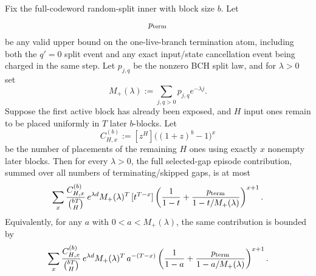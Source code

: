 \begin{lemma}
\label{lem:fullsplit-all-episode-gf-bound}
Fix the full-codeword random-split inner with block size \(b\).  Let
\[
p_{\rm term}
\]
be any valid upper bound on the one-live-branch termination atom, including both the \(q'=0\) split event and any
exact input/state cancellation event being charged in the same step.  Let \(p_{j,q}\) be the nonzero BCH split law, and
for \(\lambda>0\) set
\[
M_+(\lambda):=\sum_{j,q>0} p_{j,q}e^{-\lambda j}.
\]
Suppose the first active block has already been exposed, and \(H\) input ones remain to be placed uniformly in \(T\)
later \(b\)-blocks.  Let
\[
C_{H,x}^{(b)}:=[z^H]\big((1+z)^b-1\big)^x
\]
be the number of placements of the remaining \(H\) ones using exactly \(x\) nonempty later blocks.  Then for every
\(\lambda>0\), the full selected-gap episode contribution, summed over all numbers of terminating/skipped gaps, is at
most
\begin{equation}
\label{eq:fullsplit-all-e-gf-exactcoeff}
\sum_x
\frac{C_{H,x}^{(b)}}{\binom{bT}{H}}\,
e^{\lambda d}M_+(\lambda)^T\,
[t^{T-x}]
\left(
\frac{1}{1-t}
+
\frac{p_{\rm term}}{1-t/M_+(\lambda)}
\right)^{x+1}.
\end{equation}
Equivalently, for any \(a\) with \(0<a<M_+(\lambda)\), the same contribution is bounded by
\begin{equation}
\label{eq:fullsplit-all-e-gf-cauchy}
\sum_x
\frac{C_{H,x}^{(b)}}{\binom{bT}{H}}\,
e^{\lambda d}M_+(\lambda)^T\,
a^{-(T-x)}
\left(
\frac{1}{1-a}
+
\frac{p_{\rm term}}{1-a/M_+(\lambda)}
\right)^{x+1}.
\end{equation}
\end{lemma}

